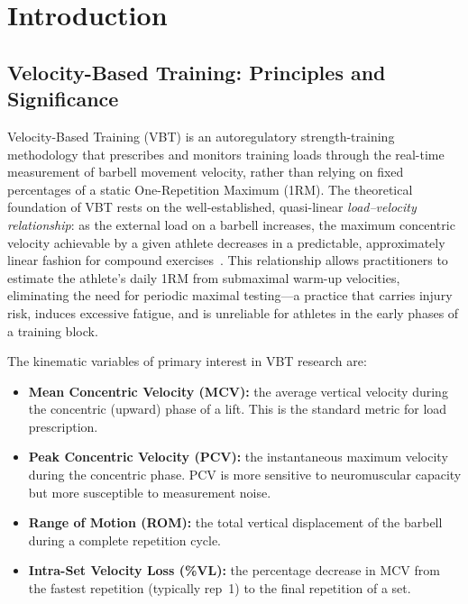 \section{Introduction}\label{sec:intro}

\subsection{Velocity-Based Training: Principles and Significance}

Velocity-Based Training (VBT) is an autoregulatory strength-training methodology that prescribes and monitors training loads through the real-time measurement of barbell movement velocity, rather than relying on fixed percentages of a static One-Repetition Maximum (1RM).
The theoretical foundation of VBT rests on the well-established, quasi-linear \emph{load--velocity relationship}: as the external load on a barbell increases, the maximum concentric velocity achievable by a given athlete decreases in a predictable, approximately linear fashion for compound exercises~\cite{gonzalez-badillo2010}.
This relationship allows practitioners to estimate the athlete's daily 1RM from submaximal warm-up velocities, eliminating the need for periodic maximal testing---a practice that carries injury risk, induces excessive fatigue, and is unreliable for athletes in the early phases of a training block.

The kinematic variables of primary interest in VBT research are:
\begin{itemize}[nosep]
  \item \textbf{Mean Concentric Velocity (MCV):} the average vertical velocity during the concentric (upward) phase of a lift. This is the standard metric for load prescription.
  \item \textbf{Peak Concentric Velocity (PCV):} the instantaneous maximum velocity during the concentric phase. PCV is more sensitive to neuromuscular capacity but more susceptible to measurement noise.
  \item \textbf{Range of Motion (ROM):} the total vertical displacement of the barbell during a complete repetition cycle.
  \item \textbf{Intra-Set Velocity Loss (\%VL):} the percentage decrease in MCV from the fastest repetition (typically rep~1) to the final repetition of a set. %
\end{itemize}

